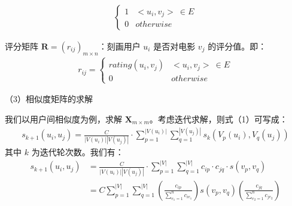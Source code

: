 \begin{spacing}{1.5}
{\begin{align}
\begin{cases}
1 &<u_i,v_j>\ \in E \\
0 &otherwise
\end{cases}
\end{align}
}\par
评分矩阵 $\mathbf{R}=(r_{ij})_{m\times n}$：刻画用户 $u_i$ 是否对电影 $v_j$ 的评分值。即：
{\setlength\abovedisplayskip{1pt}
\setlength\belowdisplayskip{1pt}
\begin{align}
r_{ij} = 
\begin{cases}
rating(u_i,v_j) &<u_i,v_j>\ \in E \\
0 &otherwise
\end{cases}
\end{align}
}\par
（3）相似度矩阵的求解\par
我们以用户间相似度为例，求解 $\mathbf{X}_{m\times m}$。考虑迭代求解，则式（1）可写成：
{\setlength\abovedisplayskip{1pt}
\setlength\belowdisplayskip{1pt}
\begin{align}
s_{k+1}(u_i,u_j)=\frac{C}{|V(u_i)||V(u_j)|}\cdot \sum_{p=1}^{|V(u_i)|}\sum_{q=1}^{|V(u_j)|} {s_k(V_p(u_i),V_q(u_j))}
\end{align}
}
其中 $k$ 为迭代轮次数。我们有：
{\setlength\abovedisplayskip{1pt}
\setlength\belowdisplayskip{1pt}
\begin{align}
s_{k+1}(u_i,u_j)&=\frac{C}{|V(u_i)||V(u_j)|}\cdot \sum_{p=1}^{|V|}\sum_{q=1}^{|V|} {c_{ip}\cdot c_{jq}\cdot s(v_p,v_q)}\\
&=C\sum_{p=1}^{|V|}\sum_{q=1}^{|V|}(\frac{c_{ip}}{\sum_{e_1=1}^{n}c_{ie_1}})s(v_p,v_q)(\frac{c_{jq}}{\sum_{e_2=1}^n c_{je_2}})
\end{align}
}


\end{spacing}
